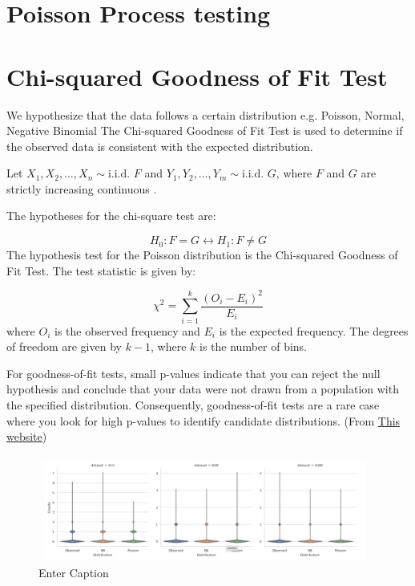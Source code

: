 \section{Poisson Process testing}
\section{Chi-squared Goodness of Fit Test}
We hypothesize that the data follows a certain distribution e.g. Poisson, Normal, Negative Binomial The Chi-squared Goodness of Fit Test is used to determine if the observed data is consistent with the expected distribution.

Let \( X_1, X_2, \ldots, X_n \sim \text{i.i.d. } F \) and \( Y_1, Y_2, \ldots, Y_m \sim \text{i.i.d. } G \), where \( F \) and \( G \) are strictly increasing continuous .

The hypotheses for the chi-square test are:

\begin{equation}
    H_0: F = G \leftrightarrow   H_1: F \neq G
\end{equation}
The hypothesis test for the Poisson distribution is the Chi-squared Goodness of Fit Test. The test statistic is given by:

\begin{equation}
    \chi^2 = \sum_{i=1}^{k} \frac{(O_i - E_i)^2}{E_i}
\end{equation}
where \(O_i\) is the observed frequency and \(E_i\) is the expected frequency. The degrees of freedom are given by \(k-1\), where \(k\) is the number of bins.

For goodness-of-fit tests, small p-values indicate that you can reject the null hypothesis and conclude that your data were not drawn from a population with the specified distribution. Consequently, goodness-of-fit tests are a rare case where you look for high p-values to identify candidate distributions. 
(From \href{https://statisticsbyjim.com/hypothesis-testing/goodness-fit-tests-discrete-distributions/}{This website})


\begin{figure}[t]
    \centering
    \includegraphics[width=1\linewidth]{images/violin_plots_per_pulse.png}
    \caption{Enter Caption}
\end{figure}


